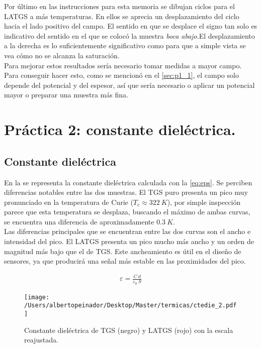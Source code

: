 \documentclass[a4paper, 12pt, spanish]{article}
\begin{document}
\begin{multicols}{2}
Por último en las instrucciones para esta memoria se dibujan ciclos para el LATGS a más temperaturas. En ellos se aprecia un desplazamiento del ciclo hacia el lado positivo del campo. El sentido en que se desplace el signo tan solo es indicativo del sentido en el que se colocó la muestra \textit{boca abajo}.El desplazamiento a la derecha es lo suficientemente significativo como para que  a simple vista se vea cómo no se alcanza la saturación.\\ Para mejorar estos resultados sería necesario tomar medidas a mayor campo. Para conseguir hacer esto, como se mencionó en el \cref{sec:p1_1}, el campo solo depende del potencial y del espesor, así que sería necesario o aplicar un potencial mayor o preparar una muestra más fina.
\section{Práctica 2: constante dieléctrica.}
\subsection*{Constante dieléctrica}
En la  se representa la constante dieléctrica calculada con la \cref{eq:eps}. Se perciben diferencias notables entre las dos muestras. El TGS puro presenta un pico muy pronunciado en la temperatura de Curie ($T_c\approx 322\ K$), por simple inspección parece que esta temperatura se desplaza, buscando el máximo de ambas curvas, se encuentra una diferencia de aproximadamente $0.3\ K$.\\
Las diferencias principales que se encuentran entre las dos curvas son el ancho e intensidad del pico. El LATGS presenta un pico mucho más ancho y un orden de magnitud más bajo que el de TGS. Este ancheamiento es útil en el diseño de sensores, ya que producirá una señal más estable en las proximidades del pico.

\begin{eqnarray}
    \varepsilon = \frac{C\ d}{\varepsilon_0\ S} \label{eq:eps}
\end{eqnarray}
\begin{figure}[H]
    \centering
    \texttt{[image: /Users/albertopeinador/Desktop/Master/termicas/ctedie\_2.pdf]}
    \caption{Constante dieléctrica de TGS (negro) y LATGS (rojo) con la escala reajustada.}\label{fig:eps}
\end{figure}

\end{multicols}
\end{document}
